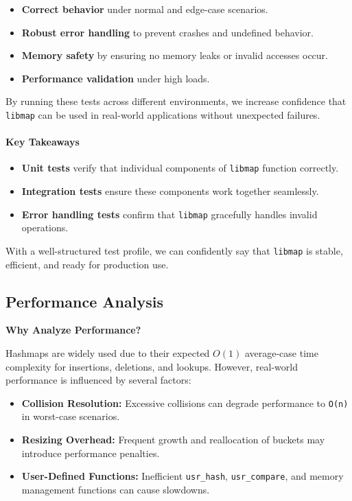 \documentclass[titlepage]{article}
\begin{document}
\begin{itemize}
    \item \textbf{Correct behavior} under normal and edge-case scenarios.
    \item \textbf{Robust error handling} to prevent crashes and undefined behavior.
    \item \textbf{Memory safety} by ensuring no memory leaks or invalid accesses occur.
    \item \textbf{Performance validation} under high loads.
\end{itemize}

By running these tests across different environments, we increase confidence that \texttt{libmap} can be used in real-world applications without unexpected failures.

\paragraph{Key Takeaways}
\begin{itemize}
    \item \textbf{Unit tests} verify that individual components of \texttt{libmap} function correctly.
    \item \textbf{Integration tests} ensure these components work together seamlessly.
    \item \textbf{Error handling tests} confirm that \texttt{libmap} gracefully handles invalid operations.
\end{itemize}

With a well-structured test profile, we can confidently say that \texttt{libmap} is stable, efficient, and ready for production use.

\subsection{Performance Analysis}

\textbf{Why Analyze Performance?}

Hashmaps are widely used due to their expected $O(1)$ average-case time complexity for insertions, deletions, and lookups. However, real-world performance is influenced by several factors:

\begin{itemize}
    \item \textbf{Collision Resolution:} Excessive collisions can degrade performance to \texttt{O(n)} in worst-case scenarios.
    \item \textbf{Resizing Overhead:} Frequent growth and reallocation of buckets may introduce performance penalties.
    \item \textbf{User-Defined Functions:} Inefficient \texttt{usr\_hash}, \texttt{usr\_compare}, and memory management functions can cause slowdowns.
\end{itemize}
\end{document}
